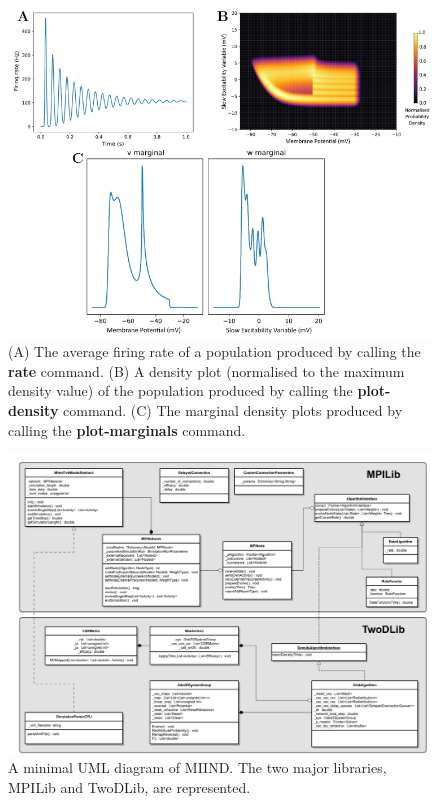 \documentclass[utf8]{frontiersSCNS} %
\begin{document}
\begin{figure}[tb!]
  \centering
    \includegraphics[width=\linewidth]{images/izh_full_figure.pdf}
  \caption{(A) The average firing rate of a population produced by calling the \textbf{rate} command. (B) A density plot (normalised to the maximum density value) of the population produced by calling the \textbf{plot-density} command. (C) The marginal density plots produced by calling the \textbf{plot-marginals} command.}
  \label{fig:rate_density_marginal}
\end{figure}

\begin{figure}[!h]
  \centering
  \includegraphics[width=\columnwidth]{images/miind_uml.pdf}
  \caption{A minimal UML diagram of MIIND. The two major libraries, MPILib and TwoDLib, are represented.}
  \label{fig:uml}
\end{figure}
\end{document}
